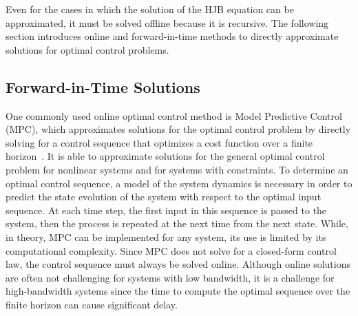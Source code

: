 Even for the cases in which the solution of the HJB equation can be approximated, it must be solved offline because it is recursive.
The following section introduces online and forward-in-time methods to directly approximate solutions for optimal control problems.



\subsection{Forward-in-Time Solutions}

One commonly used online optimal control method is Model Predictive Control (MPC), which approximates solutions for the optimal control problem by directly solving for a control sequence that optimizes a cost function over a finite horizon~\cite{Schwenzer:2021a}. It is able to approximate solutions for the general optimal control problem for nonlinear systems and for systems with constraints. To determine an optimal control sequence, a model of the system dynamics is necessary in order to predict the state evolution of the system with respect to the optimal input sequence. At each time step, the first input in this sequence is passed to the system, then the process is repeated at the next time from the next state. While, in theory, MPC can be implemented for any system, its use is limited by its computational complexity. Since MPC does not solve for a closed-form control law, the control sequence must always be solved online.
%
Although online solutions are often not challenging for systems with low bandwidth, it is a challenge for high-bandwidth systems since the time to compute the optimal sequence over the finite horizon can cause significant delay.

